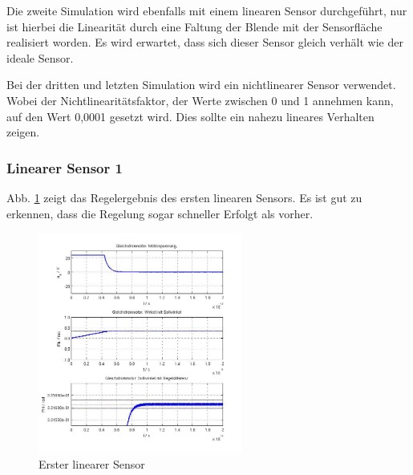 Die zweite Simulation wird ebenfalls mit einem linearen Sensor durchgeführt, nur ist hierbei die Linearität durch eine Faltung der Blende mit der Sensorfläche realisiert 
worden.
Es wird erwartet, dass sich dieser Sensor gleich verhält wie der ideale Sensor.

Bei der dritten und letzten Simulation wird ein nichtlinearer Sensor verwendet. 
Wobei der Nichtlinearitätsfaktor, der Werte zwischen 0 und 1 annehmen kann, auf den Wert 0,0001 gesetzt wird.
Dies sollte ein nahezu lineares Verhalten zeigen.

\subsubsection{Linearer Sensor 1}
\label{chap:sensorregelung1}
Abb. \ref{fig:linear1} zeigt das Regelergebnis des ersten linearen Sensors.
Es ist gut zu erkennen, dass die Regelung sogar schneller Erfolgt als vorher.
\begin{figure}[!h]
	\centering
	\includegraphics[width=0.6\textwidth]{Sensor_10_1_100_linear1.jpg}
	\caption{Erster linearer Sensor}
	\label{fig:linear1}
\end{figure}

